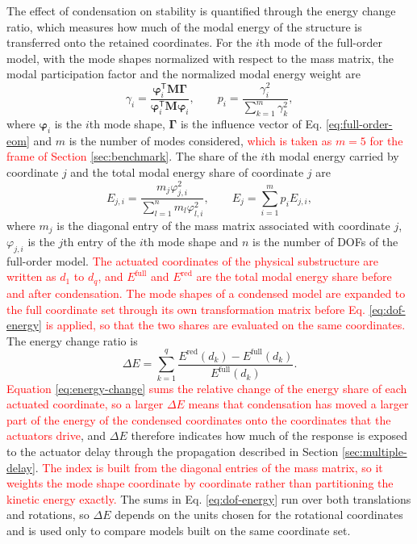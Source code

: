 \documentclass[11pt,a4paper]{article}
\numberwithin{equation}{section}
\newcommand{\rev}[1]{\textcolor{red}{#1}}
\begin{document}
The effect of condensation on stability is quantified through the energy change ratio, which measures how much of the modal energy of the structure is transferred onto the retained coordinates. For the \(i\)th mode of the full-order model, with the mode shapes normalized with respect to the mass matrix, the modal participation factor and the normalized modal energy weight are
\begin{equation}
	\gamma_{i}=
	\frac{\bm{\varphi}_{i}^{\mathsf{T}}\mathbf{M}\bm{\Gamma}}
	{\bm{\varphi}_{i}^{\mathsf{T}}\mathbf{M}\bm{\varphi}_{i}},
	\qquad
	p_{i}=\frac{\gamma_{i}^{2}}{\displaystyle\sum_{k=1}^{m}\gamma_{k}^{2}},
	\label{eq:modal-weight}
\end{equation}
where \(\bm{\varphi}_{i}\) is the \(i\)th mode shape, \(\bm{\Gamma}\) is the influence vector of Eq. \eqref{eq:full-order-eom} and \(m\) is the number of modes considered, \rev{which is taken as \(m=5\) for the frame of Section \ref{sec:benchmark}}. The share of the \(i\)th modal energy carried by coordinate \(j\) and the total modal energy share of coordinate \(j\) are
\begin{equation}
	E_{j,i}=
	\frac{m_{j}\varphi_{j,i}^{2}}{\displaystyle\sum_{l=1}^{n}m_{l}\varphi_{l,i}^{2}},
	\qquad
	E_{j}=\sum_{i=1}^{m}p_{i}E_{j,i},
	\label{eq:dof-energy}
\end{equation}
where \(m_{j}\) is the diagonal entry of the mass matrix associated with coordinate \(j\), \(\varphi_{j,i}\) is the \(j\)th entry of the \(i\)th mode shape and \(n\) is the number of DOFs of the full-order model. \rev{The actuated coordinates of the physical substructure are written as \(d_{1}\) to \(d_{q}\), and \(E^{\mathrm{full}}\) and \(E^{\mathrm{red}}\) are the total modal energy share before and after condensation. The mode shapes of a condensed model are expanded to the full coordinate set through its own transformation matrix before Eq. \eqref{eq:dof-energy} is applied, so that the two shares are evaluated on the same coordinates.} The energy change ratio is
\begin{equation}
	\Delta E=\sum_{k=1}^{q}
	\frac{E^{\mathrm{red}}(d_{k})-E^{\mathrm{full}}(d_{k})}{E^{\mathrm{full}}(d_{k})}.
	\label{eq:energy-change}
\end{equation}
\rev{Equation \eqref{eq:energy-change} sums the relative change of the energy share of each actuated coordinate, so a larger \(\Delta E\) means that condensation has moved a larger part of the energy of the condensed coordinates onto the coordinates that the actuators drive}, and \(\Delta E\) therefore indicates how much of the response is exposed to the actuator delay through the propagation described in Section \ref{sec:multiple-delay}. \rev{The index is built from the diagonal entries of the mass matrix, so it weights the mode shape coordinate by coordinate rather than partitioning the kinetic energy exactly.} The sums in Eq. \eqref{eq:dof-energy} run over both translations and rotations, so \(\Delta E\) depends on the units chosen for the rotational coordinates and is used only to compare models built on the same coordinate set.
\end{document}
